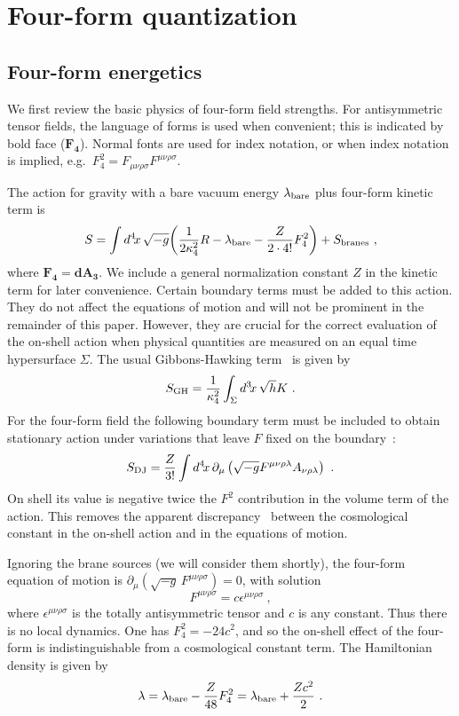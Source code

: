 \documentclass[12pt]{article}
\newcommand{\sect}[1]{\setcounter{equation}{0}\section{#1}}
\begin{document}
\sect{Four-form quantization}
\label{sec-fourform}

\subsection{Four-form energetics}

We first review the basic physics of four-form field strengths.  For
antisymmetric tensor fields, the language of forms is used when
convenient; this is indicated by bold face ($\mathbf{F_{4}}$).  Normal
fonts are used for index notation, or when index notation is implied,
e.g.\ $F_4^2 = F_{\mu\nu\rho\sigma} F^{\mu\nu\rho\sigma}$.

The action for gravity with a bare vacuum energy $\lambda_{\rm bare}$
plus four-form kinetic term is
\begin{equation}
S = \int d^4\!x\, \sqrt{-g} \biggl( \frac{1}{2\kappa_4^2} R -
    \lambda_{\rm bare} - \frac{Z}{2\cdot4!} F_{4}^2 \biggr)
+ S_{\rm branes}\ ,
\end{equation}
where $\mathbf{F_4} = \mathbf{dA_3}$.  We include a general
normalization constant $Z$ in the kinetic term for later convenience.
Certain boundary terms must be added to this action.  They do not
affect the equations of motion and will not be prominent in the
remainder of this paper.  However, they are crucial for the correct
evaluation of the on-shell action when physical quantities are
measured on an equal time hypersurface $\Sigma$.  The usual
Gibbons-Hawking term~\cite{GibHaw77b} is given by
\begin{equation}
S_{\rm GH} =   \frac{1}{\kappa_4^2} \int_{\Sigma} d^3\!x\,
        \sqrt{h} K\ .
\end{equation}
For the four-form field the following boundary term must be included
to obtain stationary action under variations that leave $F$ fixed on
the boundary~\cite{DunJen90}:
\begin{equation}
S_{\rm DJ} =  \frac{Z}{3!} \int d^4\!x\, \partial_\mu
        \left( \sqrt{-g}
        F^{\mu\nu\rho\lambda} A_{\nu\rho\lambda} \right) \ .
\label{eq-bt}
\end{equation}
On shell its value is negative twice the $F^2$ contribution in the
volume term of the action.  This removes the apparent
discrepancy~\cite{Duf89} between the cosmological constant in the
on-shell action and in the equations of motion.

Ignoring the brane sources (we will consider them shortly), the
four-form equation of motion is $\partial_\mu \left( \sqrt{-g}\,
F^{\mu\nu\rho\sigma} \right) = 0$, with solution
\begin{equation}
F^{\mu\nu\rho\sigma} = c
\epsilon^{\mu\nu\rho\sigma}\ ,
\end{equation}
where $\epsilon^{\mu\nu\rho\sigma}$ is the totally antisymmetric
tensor and $c$ is any constant.  Thus there is no local dynamics.  One
has $F_4^2 = -24 c^2$, and so the on-shell effect of the four-form is
indistinguishable from a cosmological constant term.  The Hamiltonian
density is given by
\begin{equation}
\lambda = \lambda_{\rm bare} - \frac{Z}{48} F_4^2 =
\lambda_{\rm bare} + \frac{Zc^2}{2}
\ .
\label{eq-grid-1D}
\end{equation}
\end{document}
